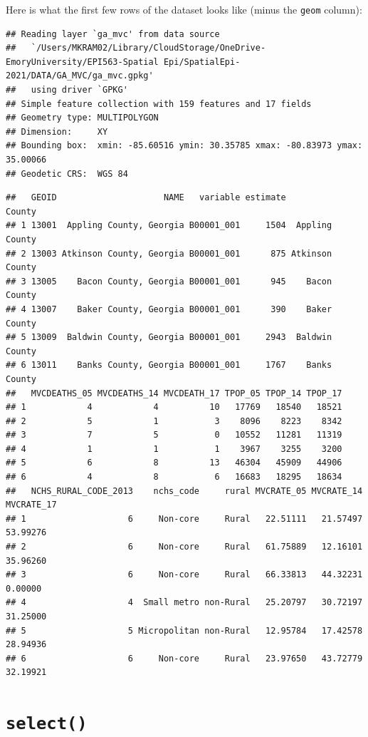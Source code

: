 \documentclass[
]{book}
\begin{document}
Here is what the first few rows of the dataset looks like (minus the \texttt{geom} column):

\begin{verbatim}
## Reading layer `ga_mvc' from data source 
##   `/Users/MKRAM02/Library/CloudStorage/OneDrive-EmoryUniversity/EPI563-Spatial Epi/SpatialEpi-2021/DATA/GA_MVC/ga_mvc.gpkg' 
##   using driver `GPKG'
## Simple feature collection with 159 features and 17 fields
## Geometry type: MULTIPOLYGON
## Dimension:     XY
## Bounding box:  xmin: -85.60516 ymin: 30.35785 xmax: -80.83973 ymax: 35.00066
## Geodetic CRS:  WGS 84
\end{verbatim}

\begin{verbatim}
##   GEOID                     NAME   variable estimate          County
## 1 13001  Appling County, Georgia B00001_001     1504  Appling County
## 2 13003 Atkinson County, Georgia B00001_001      875 Atkinson County
## 3 13005    Bacon County, Georgia B00001_001      945    Bacon County
## 4 13007    Baker County, Georgia B00001_001      390    Baker County
## 5 13009  Baldwin County, Georgia B00001_001     2943  Baldwin County
## 6 13011    Banks County, Georgia B00001_001     1767    Banks County
##   MVCDEATHS_05 MVCDEATHS_14 MVCDEATH_17 TPOP_05 TPOP_14 TPOP_17
## 1            4            4          10   17769   18540   18521
## 2            5            1           3    8096    8223    8342
## 3            7            5           0   10552   11281   11319
## 4            1            1           1    3967    3255    3200
## 5            6            8          13   46304   45909   44906
## 6            4            8           6   16683   18295   18634
##   NCHS_RURAL_CODE_2013    nchs_code     rural MVCRATE_05 MVCRATE_14 MVCRATE_17
## 1                    6     Non-core     Rural   22.51111   21.57497   53.99276
## 2                    6     Non-core     Rural   61.75889   12.16101   35.96260
## 3                    6     Non-core     Rural   66.33813   44.32231    0.00000
## 4                    4  Small metro non-Rural   25.20797   30.72197   31.25000
## 5                    5 Micropolitan non-Rural   12.95784   17.42578   28.94936
## 6                    6     Non-core     Rural   23.97650   43.72779   32.19921
\end{verbatim}

\hypertarget{select}{%
\section{\texorpdfstring{\texttt{select()}}{select()}}\label{select}}
\end{document}
